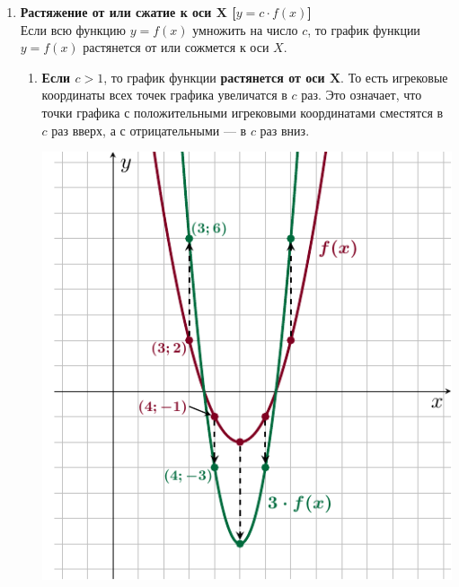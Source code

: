 \documentclass[10pt, a4paper]{article}
\begin{document}
\begin{enumerate}
\begin{enumerate}[label=\asbuk*)]
\begin{minipage}[c][][c]{0.45\textwidth}
\begin{center}
		\end{center}
		\end{minipage}
	\end{enumerate}
	\item \textbf{Растяжение от или сжатие к оси $\boldsymbol X$ [\boldmath$y=c\cdot f(x)$]}\\[1em]
	Если всю функцию $y=f(x)$ умножить на число $c$, то график функции $y=f(x)$ растянется от или сожмется к оси $X$.
	\begin{enumerate}[label=\asbuk*)]
		\item 
		\begin{minipage}[t]{0.65\textwidth}
			\textbf{Если \boldmath$ c>1$}, то график функции \textbf{растянется от оси $\boldsymbol X$}. То есть игрековые координаты всех точек графика увеличатся в $c$ раз. Это означает, что точки графика с положительными игрековыми координатами сместятся в $c$ раз вверх, а с отрицательными — в $c$ раз вниз.
		\end{minipage}
		\begin{minipage}[t]{0.25\textwidth}
			\begin{flushright}
				\includegraphics[align=t, width=\textwidth]{../graphs/graph_6/graph_6}
			\end{flushright}
		\end{minipage}

\end{enumerate}
\end{enumerate}
\end{document}
